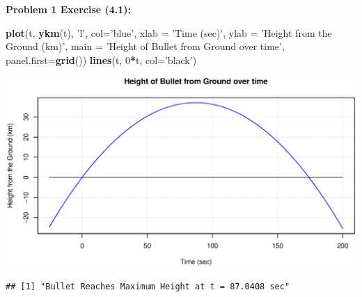 \documentclass[11pt]{article}
\newenvironment{problem}[1]{\textbf{Problem #1: }}{\newpage}
\newenvironment{Shaded}{\begin{snugshade}}{\end{snugshade}}
\newcommand{\DataTypeTok}[1]{\textcolor[rgb]{0.13,0.29,0.53}{#1}}
\newcommand{\DecValTok}[1]{\textcolor[rgb]{0.00,0.00,0.81}{#1}}
\newcommand{\KeywordTok}[1]{\textcolor[rgb]{0.13,0.29,0.53}{\textbf{#1}}}
\newcommand{\NormalTok}[1]{#1}
\newcommand{\OperatorTok}[1]{\textcolor[rgb]{0.81,0.36,0.00}{\textbf{#1}}}
\newcommand{\StringTok}[1]{\textcolor[rgb]{0.31,0.60,0.02}{#1}}
\begin{document}
\begin{problem}{1 Exercise (4.1)}
\begin{enumerate}[label = \textbf{Step \arabic*.}]
\begin{Shaded}
\begin{Highlighting}[]
\KeywordTok{plot}\NormalTok{(t, }\KeywordTok{ykm}\NormalTok{(t), }\StringTok{'l'}\NormalTok{, }\DataTypeTok{col=}\StringTok{'blue'}\NormalTok{, }
     \DataTypeTok{xlab =} \StringTok{'Time (sec)'}\NormalTok{, }\DataTypeTok{ylab =} \StringTok{'Height from the Ground (km)'}\NormalTok{, }
     \DataTypeTok{main =} \StringTok{'Height of Bullet from Ground over time'}\NormalTok{, }\DataTypeTok{panel.first=}\KeywordTok{grid}\NormalTok{())}
\KeywordTok{lines}\NormalTok{(t, }\DecValTok{0}\OperatorTok{*}\NormalTok{t, }\DataTypeTok{col=}\StringTok{'black'}\NormalTok{)}
\end{Highlighting}
\end{Shaded}

\includegraphics{Photos/Prob1}

\begin{Shaded}
\end{Shaded}

\begin{verbatim}
## [1] "Bullet Reaches Maximum Height at t = 87.0408 sec"
\end{verbatim}

\begin{Shaded}
\end{Shaded}


\end{enumerate}
\end{problem}
\end{document}
